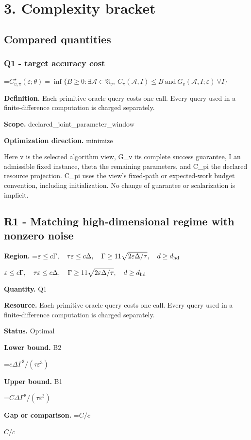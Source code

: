 \documentclass[10pt,a4paper]{article}
\newcommand{\AtlasMath}[1]{\par\begingroup\centering\setbox0=\hbox{$\displaystyle #1$}\ifdim\wd0>1.4\linewidth\typeout{ATLAS WIDE FORMULA: \the\wd0}\fi\ifdim\wd0>\linewidth\resizebox{\linewidth}{!}{\box0}\else\box0\fi\par\endgroup}
\newcommand{\AtlasInlineMath}[1]{\begingroup\setbox0=\hbox{$#1$}\ifdim\wd0>.4\linewidth\endgroup\AtlasMath{#1}\else\endgroup$#1$\fi}
\begin{document}
\section{3. Complexity bracket}
\subsection{Compared quantities}
\subsubsection{Q1 - target accuracy cost}
\AtlasMath{C^\star_{v,\pi}(\varepsilon;\theta)=\inf\{B\ge0:\exists\mathcal A\in\mathfrak A_v,\ C_\pi(\mathcal A,I)\le B\ \text{and}\ G_v(\mathcal A,I;\varepsilon)\ \forall I\}}
\textbf{Definition.} Each primitive oracle query costs one call. Every query used in a finite-difference computation is charged separately.

\textbf{Scope.} declared\_joint\_parameter\_window

\textbf{Optimization direction.} minimize

Here v is the selected algorithm view, G\_v its complete success guarantee, I an admissible fixed instance, theta the remaining parameters, and C\_pi the declared resource projection. C\_pi uses the view's fixed-path or expected-work budget convention, including initialization. No change of guarantee or scalarization is implicit.

\subsection{R1 - Matching high-dimensional regime with nonzero noise}
\textbf{Region.} \AtlasInlineMath{\varepsilon\le c\Gamma,\quad\tau\varepsilon\le c\Delta,\quad\Gamma\ge11\sqrt{2\varepsilon\Delta/\tau},\quad d\ge d_{\rm hd}}

\textbf{Quantity.} Q1

\textbf{Resource.} Each primitive oracle query costs one call. Every query used in a finite-difference computation is charged separately.

\textbf{Status.} Optimal

\textbf{Lower bound.} B2

\AtlasMath{c\Delta\Gamma^2/(\tau\varepsilon^3)}
\textbf{Upper bound.} B1

\AtlasMath{C\Delta\Gamma^2/(\tau\varepsilon^3)}
\textbf{Gap or comparison.} \AtlasInlineMath{C/c}
\end{document}
